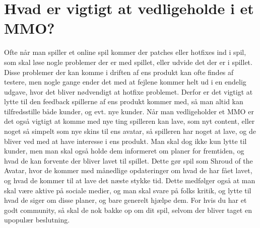 \cfoot{\page\textbackslash \totalp} %
\setcounter{page}{1}
\chapter{Hvad er vigtigt at vedligeholde i et MMO?}

Ofte når man spiller et online spil kommer der patches eller hotfixes ind i spil, som skal løse nogle problemer der er med spillet, eller udvide det der er i spillet. Disse problemer der kan komme i driften af ens produkt kan ofte findes af testere, men nogle gange ender det med at fejlene kommer helt ud i en endelig udgave, hvor det bliver nødvendigt at hotfixe problemet. Derfor er det vigtigt at lytte til den feedback spillerne af ens produkt kommer med, så man altid kan tilfredsstille både kunder, og evt. nye kunder. 
Når man vedligeholder et MMO er det også vigtigt at komme med nye ting spilleren kan lave, som nyt content, eller noget så simpelt som nye skins til ens avatar, så spilleren har noget at lave, og de bliver ved med at have interesse i ens produkt.\cite{WoW}
Man skal dog ikke kun lytte til kunder, men man skal også holde dem informeret om planer for fremtiden, og hvad de kan forvente der bliver lavet til spillet. Dette gør spil som Shroud of the Avatar\cite{SOTA}, hvor de kommer med månedlige opdateringer om hvad de har fået lavet, og hvad de kommer til at lave det næste stykke tid\cite{SOTAForum}. Dette medfølger også at man skal være aktive på sociale medier, og man skal svare på folks kritik, og lytte til hvad de siger om disse planer, og bare generelt hjælpe dem\cite{GreatMMO}. For hvis du har et godt community, så skal de nok bakke op om dit spil, selvom der bliver taget en upopulær beslutning.\cite{MMOChampion}
